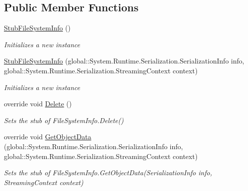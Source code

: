 \subsection*{Public Member Functions}
\begin{DoxyCompactItemize}
\item 
\hyperlink{class_system_1_1_i_o_1_1_fakes_1_1_stub_file_system_info_a487287ef80b377b05e960422e5db3e57}{Stub\-File\-System\-Info} ()
\begin{DoxyCompactList}\small\item\em Initializes a new instance\end{DoxyCompactList}\item 
\hyperlink{class_system_1_1_i_o_1_1_fakes_1_1_stub_file_system_info_ad381503184bbf497e18cc3a756e44a51}{Stub\-File\-System\-Info} (global\-::\-System.\-Runtime.\-Serialization.\-Serialization\-Info info, global\-::\-System.\-Runtime.\-Serialization.\-Streaming\-Context context)
\begin{DoxyCompactList}\small\item\em Initializes a new instance\end{DoxyCompactList}\item 
override void \hyperlink{class_system_1_1_i_o_1_1_fakes_1_1_stub_file_system_info_ac488161012b2cdc91494ca7a6af2c89d}{Delete} ()
\begin{DoxyCompactList}\small\item\em Sets the stub of File\-System\-Info.\-Delete()\end{DoxyCompactList}\item 
override void \hyperlink{class_system_1_1_i_o_1_1_fakes_1_1_stub_file_system_info_a7b816c79af6969c45d5e7dc3fd8127ce}{Get\-Object\-Data} (global\-::\-System.\-Runtime.\-Serialization.\-Serialization\-Info info, global\-::\-System.\-Runtime.\-Serialization.\-Streaming\-Context context)
\begin{DoxyCompactList}\small\item\em Sets the stub of File\-System\-Info.\-Get\-Object\-Data(\-Serialization\-Info info, Streaming\-Context context)\end{DoxyCompactList}\end{DoxyCompactItemize}
